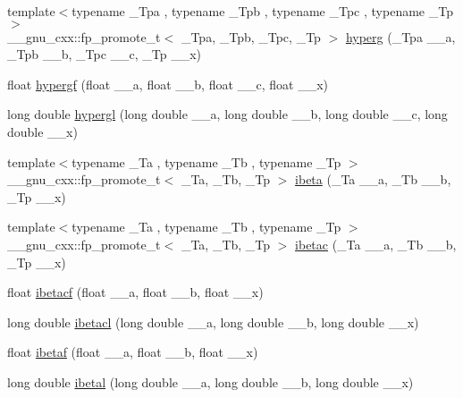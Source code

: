 \begin{DoxyCompactItemize}
\item 
{\footnotesize template$<$typename \+\_\+\+Tpa , typename \+\_\+\+Tpb , typename \+\_\+\+Tpc , typename \+\_\+\+Tp $>$ }\\\+\_\+\+\_\+gnu\+\_\+cxx\+::fp\+\_\+promote\+\_\+t$<$ \+\_\+\+Tpa, \+\_\+\+Tpb, \+\_\+\+Tpc, \+\_\+\+Tp $>$ \hyperlink{group__gnu__math__spec__func_ga374198e4076f9e23f3878ca3af70e6da}{hyperg} (\+\_\+\+Tpa \+\_\+\+\_\+a, \+\_\+\+Tpb \+\_\+\+\_\+b, \+\_\+\+Tpc \+\_\+\+\_\+c, \+\_\+\+Tp \+\_\+\+\_\+x)
\item 
float \hyperlink{group__gnu__math__spec__func_gac4c81e4ea9cef149fe40291ca10d7e15}{hypergf} (float \+\_\+\+\_\+a, float \+\_\+\+\_\+b, float \+\_\+\+\_\+c, float \+\_\+\+\_\+x)
\item 
long double \hyperlink{group__gnu__math__spec__func_ga9961967087216e97f76283f29e1be152}{hypergl} (long double \+\_\+\+\_\+a, long double \+\_\+\+\_\+b, long double \+\_\+\+\_\+c, long double \+\_\+\+\_\+x)
\item 
{\footnotesize template$<$typename \+\_\+\+Ta , typename \+\_\+\+Tb , typename \+\_\+\+Tp $>$ }\\\+\_\+\+\_\+gnu\+\_\+cxx\+::fp\+\_\+promote\+\_\+t$<$ \+\_\+\+Ta, \+\_\+\+Tb, \+\_\+\+Tp $>$ \hyperlink{group__gnu__math__spec__func_ga1fa9e260ba85fc043e3d2ada99c0143c}{ibeta} (\+\_\+\+Ta \+\_\+\+\_\+a, \+\_\+\+Tb \+\_\+\+\_\+b, \+\_\+\+Tp \+\_\+\+\_\+x)
\item 
{\footnotesize template$<$typename \+\_\+\+Ta , typename \+\_\+\+Tb , typename \+\_\+\+Tp $>$ }\\\+\_\+\+\_\+gnu\+\_\+cxx\+::fp\+\_\+promote\+\_\+t$<$ \+\_\+\+Ta, \+\_\+\+Tb, \+\_\+\+Tp $>$ \hyperlink{group__gnu__math__spec__func_ga2ccfb7026771d75bcc1a588edb8b0165}{ibetac} (\+\_\+\+Ta \+\_\+\+\_\+a, \+\_\+\+Tb \+\_\+\+\_\+b, \+\_\+\+Tp \+\_\+\+\_\+x)
\item 
float \hyperlink{group__gnu__math__spec__func_gabd7fa090deead18b167c26b8994b9f53}{ibetacf} (float \+\_\+\+\_\+a, float \+\_\+\+\_\+b, float \+\_\+\+\_\+x)
\item 
long double \hyperlink{group__gnu__math__spec__func_ga48995d537b82e426362a4831ffa1be39}{ibetacl} (long double \+\_\+\+\_\+a, long double \+\_\+\+\_\+b, long double \+\_\+\+\_\+x)
\item 
float \hyperlink{group__gnu__math__spec__func_ga97a5e3afdd990a2d3e199df6856bcf9f}{ibetaf} (float \+\_\+\+\_\+a, float \+\_\+\+\_\+b, float \+\_\+\+\_\+x)
\item 
long double \hyperlink{group__gnu__math__spec__func_ga5c9c5b583e4f1c9785a1c4582551c97f}{ibetal} (long double \+\_\+\+\_\+a, long double \+\_\+\+\_\+b, long double \+\_\+\+\_\+x)

\end{DoxyCompactItemize}
